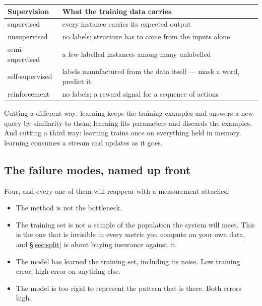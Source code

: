 \documentclass[11pt,a4paper]{article}
\begin{document}
\begin{center}
\small
\begin{tabular}{lp{}}
\toprule
\textbf{Supervision} & \textbf{What the training data carries} \\
\midrule
supervised      & every instance carries its expected output \\
unsupervised    & no labels; structure has to come from the inputs alone \\
semi-supervised & a few labelled instances among many unlabelled \\
self-supervised & labels manufactured from the data itself --- mask a word,
                  predict it \\
reinforcement   & no labels; a reward signal for a sequence of actions \\
\bottomrule
\end{tabular}
\end{center}

Cutting a different way:  learning keeps the training
examples and answers a new query by similarity to them; 
learning fits parameters and discards the examples. And cutting a third way:
 learning trains once on everything held in memory, 
learning consumes a stream and updates as it goes.

\subsection{The failure modes, named up front}

Four, and every one of them will reappear with a measurement attached:

\begin{itemize}[leftmargin=1.4em,itemsep=2pt]
  \item {} The method is not the bottleneck.
  \item {} The training set is not a sample of the
        population the system will meet. This is the one that is invisible in
        every metric you compute on your own data, and \S\ref{sec:split} is
        about buying insurance against it.
  \item {} The model has learned the training set, including
        its noise. Low training error, high error on anything else.
  \item {} The model is too rigid to represent the pattern
        that is there. Both errors high.
\end{itemize}
\end{document}
